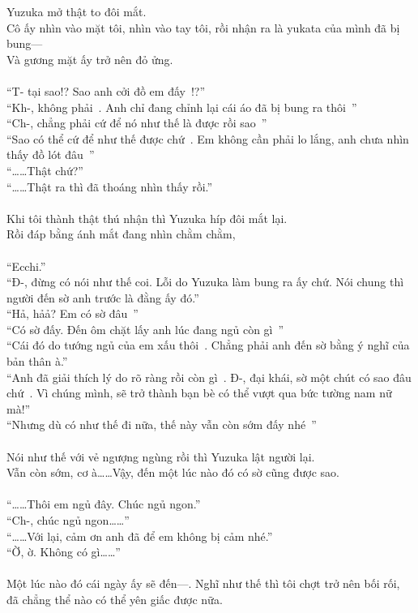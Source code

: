 \documentclass[12pt,a4paper, twosides]{book}
\begin{document}
Yuzuka mở thật to đôi mắt.\\
Cô ấy nhìn vào mặt tôi, nhìn vào tay tôi, rồi nhận ra là yukata của mình đã bị bung—\\
Và gương mặt ấy trở nên đỏ ửng.\\
\\
“T- tại sao!? Sao anh cởi đồ em đấy~!?”\\
“Kh-, không phải~. Anh chỉ đang chỉnh lại cái áo đã bị bung ra thôi~”\\
“Ch-, chẳng phải cứ để nó như thế là được rồi sao~”\\
“Sao có thể cứ để như thế được chứ~. Em không cần phải lo lắng, anh chưa nhìn thấy đồ lót đâu~”\\
“……Thật chứ?”\\
“……Thật ra thì đã thoáng nhìn thấy rồi.”\\
\\
Khi tôi thành thật thú nhận thì Yuzuka híp đôi mắt lại.\\
Rồi đáp bằng ánh mắt đang nhìn chằm chằm,\\
\\
“Ecchi.”\\
“Đ-, đừng có nói như thế coi. Lỗi do Yuzuka làm bung ra ấy chứ. Nói chung thì người đến sờ anh trước là đằng ấy đó.”\\
“Hả, hảả? Em có sờ đâu~”\\
“Có sờ đấy. Đến ôm chặt lấy anh lúc đang ngủ còn gì~”\\
“Cái đó do tướng ngủ của em xấu thôi~. Chẳng phải anh đến sờ bằng ý nghĩ của bản thân à.”\\
“Anh đã giải thích lý do rõ ràng rồi còn gì~. Đ-, đại khái, sờ một chút có sao đâu chứ~. Vì chúng mình, sẽ trở thành bạn bè có thể vượt qua bức tường nam nữ mà!”\\
“Nhưng dù có như thế đi nữa, thế này vẫn còn sớm đấy nhé~”\\
\\
Nói như thế với vẻ ngượng ngùng rồi thì Yuzuka lật người lại.\\
Vẫn còn sớm, cơ à……Vậy, đến một lúc nào đó có sờ cũng được sao.\\
\\
“……Thôi em ngủ đây. Chúc ngủ ngon.”\\
“Ch-, chúc ngủ ngon……”\\
“……Với lại, cảm ơn anh đã để em không bị cảm nhé.”\\
“Ờ, ờ. Không có gì……”\\
\\
Một lúc nào đó cái ngày ấy sẽ đến—. Nghĩ như thế thì tôi chợt trở nên bối rối, đã chẳng thể nào có thể yên giấc được nữa.\\
\end{document}
